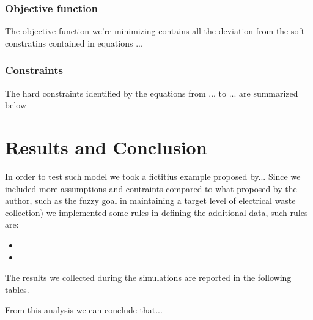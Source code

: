 \documentclass{article}
\begin{document}
\subsubsection{Objective function}
The objective function we're minimizing contains all the deviation from the soft constratins contained in equations ... 
\subsubsection{Constraints}
The hard constraints identified by the equations from ... to ... are summarized below 


\section{Results and Conclusion}
In order to test such model we took a fictitius example proposed by... Since we included more assumptions and contraints compared to what proposed by the author, such as the fuzzy goal in maintaining a target level of electrical waste collection) we implemented some rules in defining the additional data, such rules are:
\begin{itemize}
	\item
	\item
\end{itemize}
The results we collected during the simulations are reported in the following tables.

From this analysis we can conclude that...

\newpage 

\printbibliography
\end{document}

